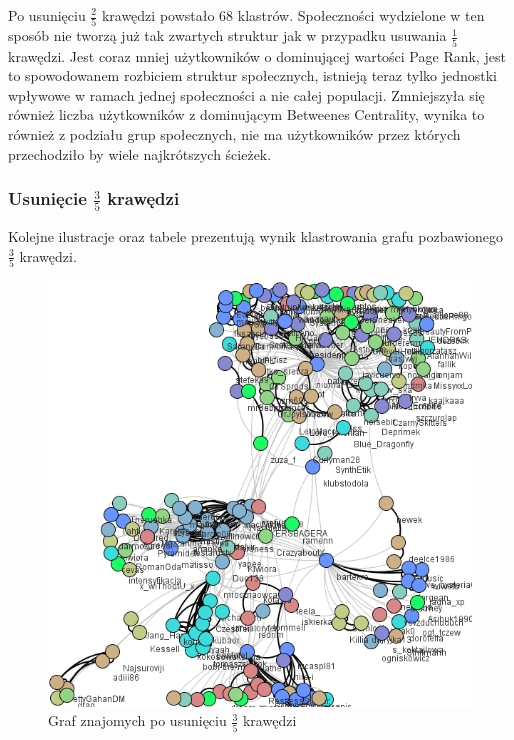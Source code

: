 \documentclass[10pt,a4paper]{article}
\begin{document}
Po usunięciu $\frac{2}{5}$ krawędzi powstało 68 klastrów. Społeczności wydzielone w ten sposób nie tworzą już tak zwartych struktur jak w przypadku usuwania $\frac{1}{5}$ krawędzi. Jest coraz mniej użytkowników o dominującej wartości Page Rank, jest to spowodowanem rozbiciem struktur społecznych, istnieją teraz tylko jednostki wpływowe w ramach jednej społeczności a nie całej populacji. Zmniejszyła się również liczba użytkowników z dominującym Betweenes Centrality, wynika to również z podziału grup społecznych, nie ma użytkowników przez których przechodziło by wiele najkrótszych ścieżek.

\subsubsection {Usunięcie $\frac{3}{5}$ krawędzi}
Kolejne ilustracje oraz tabele prezentują wynik klastrowania grafu pozbawionego  $\frac{3}{5}$  krawędzi.
\begin{figure}[H]
\centering
\caption{Graf znajomych po usunięciu $\frac{3}{5}$ krawędzi}
\includegraphics[scale=0.6]{wyniki/final200Friends/3200friends.png}
\end{figure}
\end{document}
